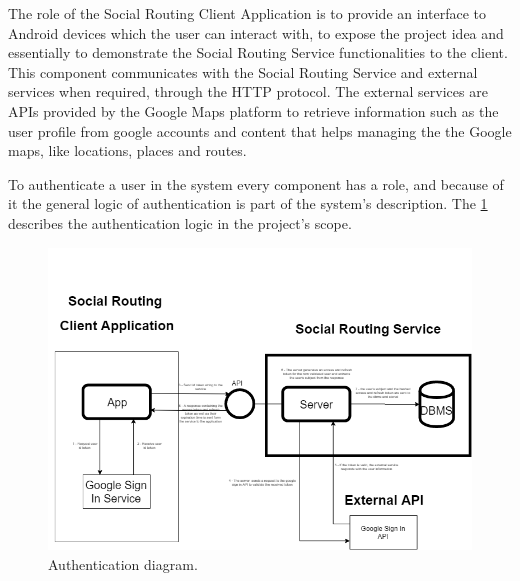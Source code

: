         The role of the Social Routing Client Application is to provide an interface to Android \cite{androiddocs} devices which the user can interact with, to expose the project 
        idea and essentially to demonstrate the Social Routing Service functionalities to the client. This component communicates with the Social Routing Service and 
        external services when required, through the HTTP protocol. The external services are APIs provided by the Google Maps platform \cite{googlemapsplatform} 
        to retrieve information such as the user profile from google accounts and content that helps managing the the Google maps, like locations, places and routes. 

        To authenticate a user in the system every component has a role, and because of it the general
        logic of authentication is part of the system's description. The \ref{fig:authenticationdiagram} describes the authentication logic in
        the project's scope.

        \begin{figure}[h]            
            \includegraphics[width=\textwidth]{images/project-structure/authentication-diagram.PNG}
            \caption{Authentication diagram.}
            \label{fig:authenticationdiagram}
        \end{figure} 